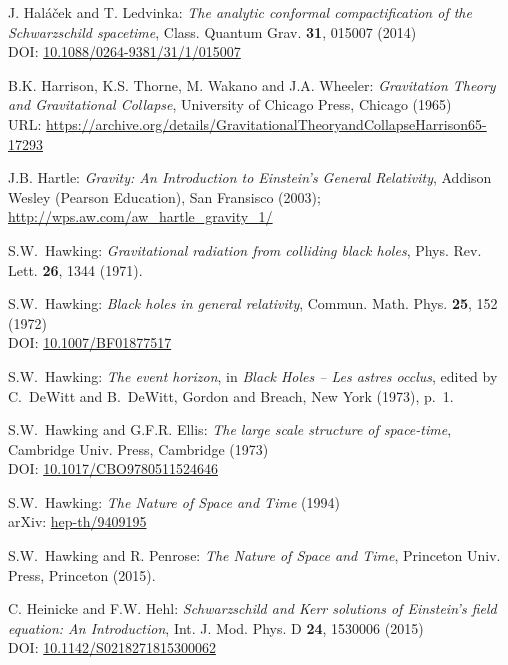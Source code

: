 \begin{thebibliography}{123}
J. Hal\'a\v{c}ek and T. Ledvinka:
{\em The analytic conformal compactification of the Schwarzschild spacetime},
Class. Quantum Grav. {\bf 31}, 015007 (2014)\\
DOI: \href{https://doi.org/10.1088/0264-9381/31/1/015007}{10.1088/0264-9381/31/1/015007}

B.K. Harrison, K.S. Thorne, M. Wakano and J.A. Wheeler:
{\em Gravitation Theory and Gravitational Collapse},
University of Chicago Press, Chicago (1965)\\
URL: {\footnotesize\url{https://archive.org/details/GravitationalTheoryandCollapseHarrison65-17293}}

J.B. Hartle: \emph{Gravity: An Introduction to Einstein's General Relativity},
Addison Wesley (Pearson Education), San Fransisco (2003); \\
\url{http://wps.aw.com/aw_hartle_gravity_1/}

S.W.~Hawking: {\em Gravitational radiation from colliding black holes},
Phys. Rev. Lett. {\bf 26}, 1344 (1971).

S.W.~Hawking: {\em Black holes in general relativity},
Commun. Math. Phys. {\bf 25}, 152 (1972)\\
DOI: \href{https://doi.org/10.1007/BF01877517}{10.1007/BF01877517}

S.W.~Hawking: {\em The event horizon},
in {\em Black Holes -- Les astres occlus}, edited by C.~DeWitt and B.~DeWitt,
Gordon and Breach, New York (1973), p.~1.

S.W.~Hawking and G.F.R. Ellis: {\em The large scale structure of
space-time},
Cambridge Univ. Press, Cambridge (1973)\\
DOI: \href{https://doi.org/10.1017/CBO9780511524646}{10.1017/CBO9780511524646}

S.W.~Hawking: {\em The Nature of Space and Time} (1994)\\
arXiv: \href{https://arxiv.org/abs/hep-th/9409195}{hep-th/9409195}

S.W.~Hawking and R. Penrose: {\em The Nature of Space and Time},
Princeton Univ. Press, Princeton (2015).

C. Heinicke and F.W. Hehl:
{\em Schwarzschild and Kerr solutions of Einstein's field equation: An Introduction},
Int. J. Mod. Phys. D {\bf 24}, 1530006 (2015)\\
DOI: \href{https://doi.org/10.1142/S0218271815300062}{10.1142/S0218271815300062}


\end{thebibliography}
